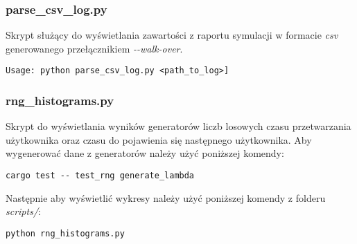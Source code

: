 \subsubsection{parse\_csv\_log.py}
Skrypt służący do wyświetlania zawartości z raportu symulacji w formacie \emph{csv} generowanego przełącznikiem \emph{-{}-walk-over}.
{
\selectfont 
\begin{verbatim}
Usage: python parse_csv_log.py <path_to_log>]
\end{verbatim}
}

\subsubsection{rng\_histograms.py}
Skrypt do wyświetlania wyników generatorów liczb losowych czasu przetwarzania użytkownika oraz czasu do pojawienia się następnego użytkownika. Aby wygenerować dane z generatorów należy użyć poniższej komendy:
{
\selectfont 
\begin{verbatim}
cargo test -- test_rng generate_lambda
\end{verbatim}
}
\noindent Następnie aby wyświetlić wykresy należy użyć poniższej komendy z folderu \emph{scripts/}:
{
\selectfont 
\begin{verbatim}
python rng_histograms.py
\end{verbatim}
}